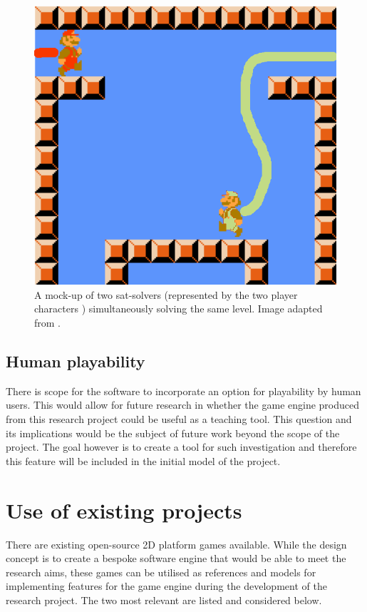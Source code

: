 \documentclass[11pt, a4paper, oneside]{report} %
\begin{document}
\begin{figure}[h!]

  \centering
    \includegraphics[scale=0.3]{running}
  \caption{A mock-up of two sat-solvers (represented by the two player characters
) simultaneously solving the same level. Image adapted from \cite{Aloupis2012}.}
  \label{model_project}
\end{figure}


\subsection{Human playability}

There is scope for the software to incorporate an option for playability by
human users. This would allow for future research in whether the game engine
produced from this research project could be useful as a teaching tool. This
question and its implications would be the subject of future work beyond the
scope of the project. The goal however is to create a tool for such
investigation and therefore this feature will be included in the initial model
of the project.


\section{Use of existing projects}

There are existing open-source 2D platform games available. While the design
concept is to create a bespoke software engine that would be able to meet the
research aims, these games can be utilised as references and models for
implementing features for the game engine during the development of the research
project. The two most relevant are listed and considered below.
\end{document}
